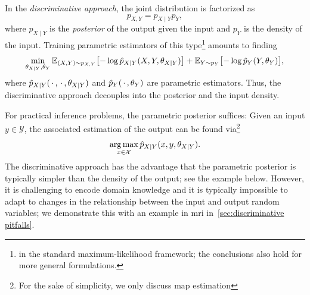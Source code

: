 In the \emph{discriminative approach}, the joint distribution is factorized as
\begin{equation}
	p_{X, Y} = p_{X\mid Y} p_Y,
\end{equation}
where \( p_{X\mid Y} \) is the \emph{posterior} of the output given the input and \( p_Y \) is the density of the input.
Training parametric estimators of this type\footnote{%
	in the standard maximum-likelihood framework; the conclusions also hold for more general formulations.
} amounts to finding
\begin{equation}
	\min_{\theta_{X \mid Y}, \theta_Y} \mathbb{E}_{(X, Y) \sim p_{X, Y}}\bigl[ -\log \hat{p}_{X\mid Y}(X, Y, \theta_{X\mid Y}) \bigr] + \mathbb{E}_{Y \sim p_Y} \bigl[ -\log \hat{p}_Y(Y, \theta_Y) \bigr],
\end{equation}
where  \( \hat{p}_{X\mid Y}(\,\cdot\,,\,\cdot\,,\theta_{X\mid Y}) \) and \( \hat{p}_Y(\,\cdot\,, \theta_Y) \) are parametric estimators.
Thus, the discriminative approach decouples into the posterior and the input density.

For practical inference problems, the parametric posterior suffices:
Given an input \( y \in \mathcal{Y} \), the associated estimation of the output can be found via\footnote{For the sake of simplicity, we only discuss \gls{map} estimation}
\begin{equation}
	\operatorname*{arg\,max}_{x \in \mathcal{X}} \hat{p}_{X \mid Y} (x, y, \theta_{X \mid Y}).
\end{equation}
The discriminative approach has the advantage that the parametric posterior is typically simpler than the density of the output; see the example below.
However, it is challenging to encode domain knowledge and it is typically impossible to adapt to changes in the relationship between the input and output random variables;
we demonstrate this with an example in \gls{mri} in~\cref{sec:discriminative pitfalls}.

